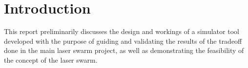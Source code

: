 \chapter{Introduction}
\label{intro}
This report preliminarily discusses the design and workings of a simulator tool developed with the purpose of guiding and validating the results of the tradeoff done in the main laser swarm project, as well as demonstrating the feasibility of the concept of the laser swarm.

